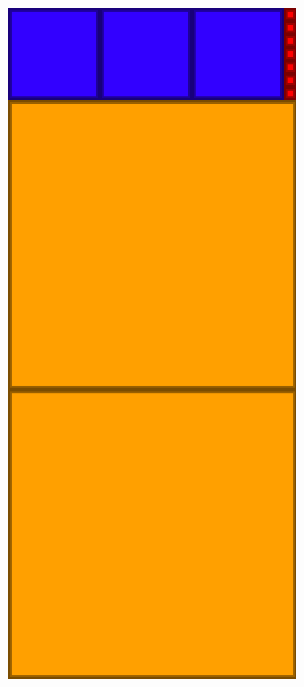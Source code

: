 \documentclass{beamer}
\begin{document}
\begin{frame}
\begin{columns}[c]
    \includegraphics[width=1\textwidth]{img/euclid}
  \end{columns}
\end{frame}
\end{document}

